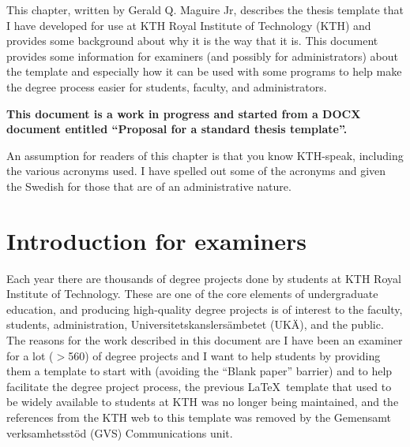 This chapter, written by Gerald Q. Maguire Jr, describes the thesis template that I have developed for use at KTH Royal Institute of Technology (KTH) and provides some background about why it is the way that it is. This document provides some information for examiners (and possibly for administrators) about the template and especially how it can be used with some programs to help make the degree process easier for students, faculty, and administrators.

\textbf{This document is a work in progress and started from a DOCX document entitled ``Proposal for a standard thesis template''.}

An assumption for readers of this chapter is that you know KTH-speak, including the various acronyms used. I have spelled out some of the acronyms and given the Swedish for those that are of an administrative nature.

\section{Introduction for examiners}
\label{sec:IntroForExaminers}

Each year there are thousands of degree projects done by students at KTH Royal Institute of Technology. These are one of the core elements of undergraduate education, and producing high-quality degree projects is of interest to the faculty, students, administration, Universitetskanslersämbetet (UKÄ), and the public. The reasons for the work described in this document are \first I have been an examiner for a lot ($>$560) of degree projects and I want to help students by providing them a template to start with (avoiding the ``Blank paper'' barrier) and to help facilitate the degree project process, \Second the previous \LaTeX~template that used to be widely available to students at KTH was no longer being maintained, and \third the references from the KTH web to this template was removed by the Gemensamt verksamhetsstöd (GVS) Communications unit.

